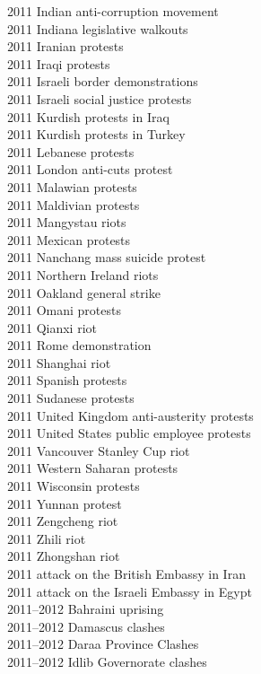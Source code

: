 2011 Indian anti-corruption movement\\
2011 Indiana legislative walkouts\\
2011 Iranian protests\\
2011 Iraqi protests\\
2011 Israeli border demonstrations\\
2011 Israeli social justice protests\\
2011 Kurdish protests in Iraq\\
2011 Kurdish protests in Turkey\\
2011 Lebanese protests\\
2011 London anti-cuts protest\\
2011 Malawian protests\\
2011 Maldivian protests\\
2011 Mangystau riots\\
2011 Mexican protests\\
2011 Nanchang mass suicide protest\\
2011 Northern Ireland riots\\
2011 Oakland general strike\\
2011 Omani protests\\
2011 Qianxi riot\\
2011 Rome demonstration\\
2011 Shanghai riot\\
2011 Spanish protests\\
2011 Sudanese protests\\
2011 United Kingdom anti-austerity protests\\
2011 United States public employee protests\\
2011 Vancouver Stanley Cup riot\\
2011 Western Saharan protests\\
2011 Wisconsin protests\\
2011 Yunnan protest\\
2011 Zengcheng riot\\
2011 Zhili riot\\
2011 Zhongshan riot\\
2011 attack on the British Embassy in Iran\\
2011 attack on the Israeli Embassy in Egypt\\
2011–2012 Bahraini uprising\\
2011–2012 Damascus clashes\\
2011–2012 Daraa Province Clashes\\
2011–2012 Idlib Governorate clashes\\
